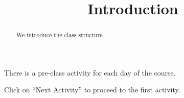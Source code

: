 \documentclass{ximera}
\title{Introduction}
\begin{document}
\begin{abstract}
We introduce the class structure..
\end{abstract}
\maketitle

There is a pre-class activity for each day of the course.

Click on ``Next Activity'' to proceed to the first activity.
\end{document}
